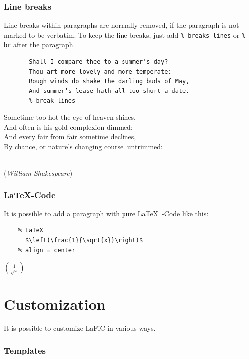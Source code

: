 \documentclass{article}
\begin{document}
\section{Line breaks}

{Line breaks within paragraphs are normally removed, if the
paragraph is not marked to be verbatim. To keep the line
breaks, just add \texttt{\% breaks lines} or \texttt{\% br} after the paragraph.\\}

\begin{verbatim}
       Shall I compare thee to a summer’s day?
       Thou art more lovely and more temperate:
       Rough winds do shake the darling buds of May,
       And summer’s lease hath all too short a date:
       % break lines
\end{verbatim}


{Sometime too hot the eye of heaven shines,\\
And often is his gold complexion dimmed;\\
And every fair from fair sometime declines,\\
By chance, or nature’s changing course, untrimmed:\\\\}

{\raggedleft%
(\emph{William Shakespeare})\\}

\section{LaTeX-Code}

{It is possible to add a paragraph with pure \LaTeX\ -Code like
this:\\}

\begin{verbatim}
	% LaTeX
  	  $\left(\frac{1}{\sqrt{x}}\right)$  
	% align = center
\end{verbatim}


\centering%
  $\left(\frac{1}{\sqrt{x}}\right)$
\part{Customization}

{It is possible to customize LaFiC in various ways.\\}

\section{Templates}
\end{document}
